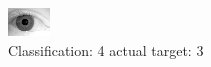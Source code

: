 \begin{figure}[h!]
\begin{center}
\includegraphics[width=0.60\columnwidth]{figures/ID2171_class_4_target_3.png}
\end{center}
\caption{ Classification: 4 actual target: 3}
\label{fig:ID2171_class_4_target_3}
\end{figure}
